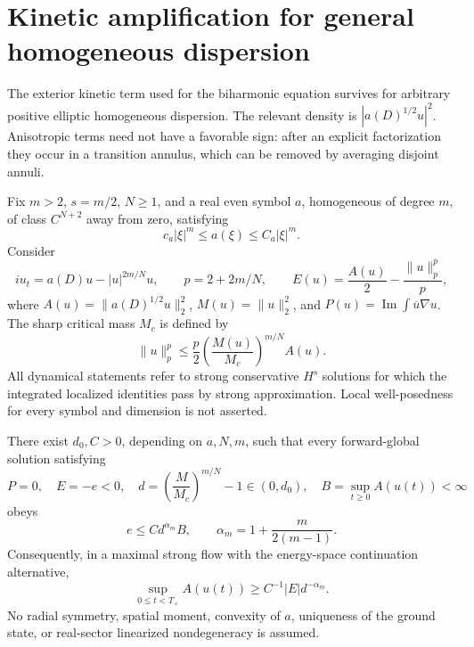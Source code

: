 \section{Kinetic amplification for general homogeneous dispersion}
\label{sec:r13-general-dispersion}

The exterior kinetic term used for the biharmonic equation survives for
arbitrary positive elliptic homogeneous dispersion. The relevant density
is $|a(D)^{1/2}u|^2$. Anisotropic terms need not have a favorable sign:
after an explicit factorization they occur in a transition annulus, which
can be removed by averaging disjoint annuli.

Fix $m>2$, $s=m/2$, $N\ge1$, and a real even symbol $a$, homogeneous
of degree $m$, of class $C^{N+2}$ away from zero, satisfying
\[
 c_a|\xi|^m\le a(\xi)\le C_a|\xi|^m.
\]
Consider
\begin{equation}\label{r13g:equation}
 iu_t=a(D)u-|u|^{2m/N}u,
 \qquad p=2+2m/N,
 \qquad E(u)=\frac{A(u)}2-\frac{\|u\|_p^p}{p},
\end{equation}
where $A(u)=\|a(D)^{1/2}u\|_2^2$, $M(u)=\|u\|_2^2$, and
$P(u)=\operatorname{Im}\int\overline u\nabla u$.
The sharp critical mass $M_c$ is defined by
\[
 \|u\|_p^p\le\frac p2\left(\frac{M(u)}{M_c}\right)^{m/N}A(u).
\]
All dynamical statements refer to strong conservative $H^s$ solutions
for which the integrated localized identities pass by strong approximation.
Local well-posedness for every symbol and dimension is not asserted.

\begin{theorem}
\label{thm:r13g-amplification}
There exist $d_0,C>0$, depending on $a,N,m$, such that every
forward-global solution satisfying
\[
 P=0,\quad E=-e<0,\quad
 d=\left(\frac{M}{M_c}\right)^{m/N}-1\in(0,d_0),\quad
 B=\sup_{t\ge0}A(u(t))<\infty
\]
obeys
\begin{equation}\label{r13g:amplification}
 e\le C d^{\alpha_m}B,
 \qquad \alpha_m=1+\frac{m}{2(m-1)}.
\end{equation}
Consequently, in a maximal strong flow with the energy-space
continuation alternative,
\begin{equation}\label{r13g:maximal}
 \sup_{0\le t<T_+} A(u(t))\ge C^{-1}|E|d^{-\alpha_m}.
\end{equation}
No radial symmetry, spatial moment, convexity of $a$, uniqueness of
the ground state, or real-sector linearized nondegeneracy is assumed.
\end{theorem}

